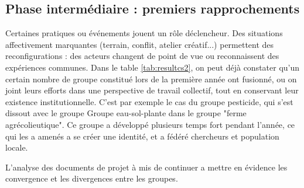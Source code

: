 \documentclass{article}
\begin{document}
\subsection{Phase intermédiaire : premiers rapprochements}\label{sec:phaseIntermediaire}
Certaines pratiques ou événements jouent un rôle déclencheur. Des situations affectivement marquantes (terrain, conflit, atelier créatif...) permettent des reconfigurations : des acteurs changent de point de vue ou reconnaissent des expériences communes. Dans le table \ref{tab:resultcs2}, on peut déjà constater qu'un certain nombre de groupe constitué lors de la première année ont fusionné, ou on joint leurs efforts dans une perspective de travail collectif, tout en conservant leur existence institutionnelle. C'est par exemple le cas du groupe pesticide, qui s'est dissout avec le groupe Groupe eau-sol-plante dans le groupe "ferme agrécolieutique". Ce groupe a développé plusieurs temps fort pendant l'année, ce qui les a amenés a se créer une identité, et a fédéré chercheurs et population locale. 

L'analyse des documents de projet à mis de continuer a mettre en évidence les convergence et les divergences entre les groupes. 
\end{document}
